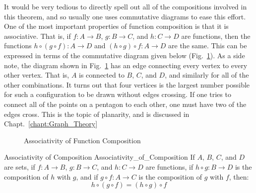         It would be very tedious to directly spell out all of the compositions
        involved in this theorem, and so usually one uses commutative diagrams
        to ease this effort. One of the most important properties of function
        composition is that it is associative. That is, if $f:A\rightarrow{B}$,
        $g:B\rightarrow{C}$, and $h:C\rightarrow{D}$ are functions, then the
        functions $h\circ(g\circ{f}):A\rightarrow{D}$ and
        $(h\circ{g})\circ{f}:A\rightarrow{D}$ are the same. This can be
        expressed in terms of the commutative diagram given below
        (Fig.~\ref{fig:Associativity_of_Function_Comp}). As a side note, the
        diagram shown in Fig.~\ref{fig:Associativity_of_Function_Comp} has an
        edge connecting every vertex to every other vertex. That is, $A$ is
        connected to $B$, $C$, and $D$, and similarly for all of the other
        combinations. It turns out that four vertices is the largest number
        possible for such a configuration to be drawn without edges crossing.
        If one tries to connect all of the points on a pentagon to each other,
        one must have two of the edges cross. This is the topic of planarity,
        and is discussed in Chapt.~\ref{chapt:Graph_Theory}
        \begin{figure}[H]
            \centering
            \captionsetup{type=figure}
            
            \caption{Associativity of Function Composition}
            \label{fig:Associativity_of_Function_Comp}
        \end{figure}
        \begin{ftheorem}{Associativity of Composition}
                        {Associativity_of_Composition}
            If $A$, $B$, $C$, and $D$ are sets, if $f:A\rightarrow{B}$,
            $g:B\rightarrow{C}$, and $h:C\rightarrow{D}$ are functions, if
            $h\circ{g}:B\rightarrow{D}$ is the composition of $h$ with $g$, and
            if $g\circ{f}:A\rightarrow{C}$ is the composition of $g$ with $f$,
            then:
            \begin{equation*}
                h\circ(g\circ{f})=(h\circ{g})\circ{f}
            \end{equation*}
        \end{ftheorem}
